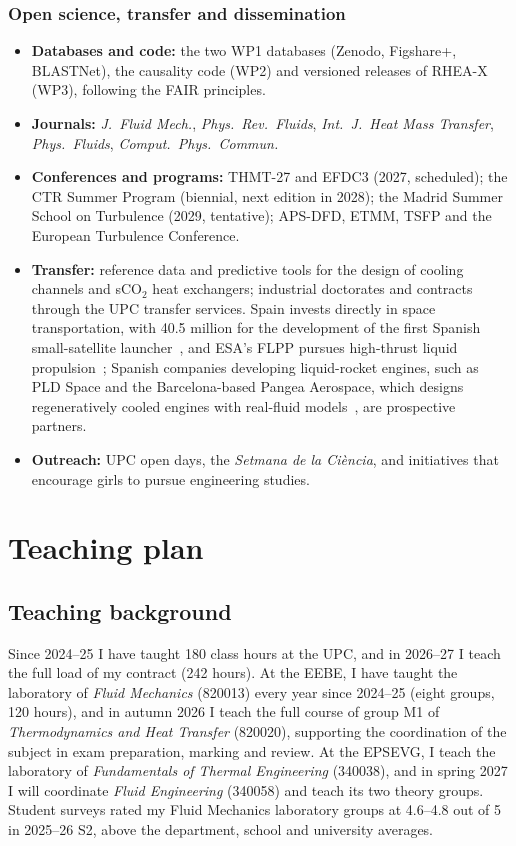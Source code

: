 \documentclass[11pt]{article}
\begin{document}
\subsubsection*{Open science, transfer and dissemination}
\begin{itemize}
  \item \textbf{Databases and code:} the two WP1 databases (Zenodo, Figshare+, BLASTNet), the
  causality code (WP2) and versioned releases of RHEA-X (WP3), following the FAIR principles.
  \item \textbf{Journals:} \emph{J.\ Fluid Mech.}, \emph{Phys.\ Rev.\ Fluids}, \emph{Int.\ J.\
  Heat Mass Transfer}, \emph{Phys.\ Fluids}, \emph{Comput.\ Phys.\ Commun.}
  \item \textbf{Conferences and programs:} THMT-27 and EFDC3 (2027, scheduled); the CTR Summer
  Program (biennial, next edition in 2028); the Madrid Summer School on Turbulence (2029,
  tentative); APS-DFD, ETMM, TSFP and the European Turbulence Conference.
  \item \textbf{Transfer:} reference data and predictive tools for the design of cooling
  channels and sCO$_2$ heat exchangers; industrial doctorates and contracts through the UPC
  transfer services. Spain invests directly in space transportation, with \texteuro{}40.5
  million for the development of the first Spanish small-satellite launcher~\cite{CDTI2024},
  and ESA's FLPP pursues high-thrust liquid propulsion~\cite{ESA2026}; Spanish companies
  developing liquid-rocket engines, such as PLD Space and the Barcelona-based Pangea Aerospace,
  which designs regeneratively cooled engines with real-fluid models~\cite{Esnault2021}, are
  prospective partners.
  \item \textbf{Outreach:} UPC open days, the \emph{Setmana de la Ci\`encia}, and initiatives
  that encourage girls to pursue engineering studies.
\end{itemize}

\section{Teaching plan}\label{sec:teaching}

\subsection{Teaching background}
Since 2024--25 I have taught 180 class hours at the UPC, and in 2026--27 I teach the full
load of my contract (242 hours). At the EEBE, I have taught the laboratory of \emph{Fluid
Mechanics} (820013) every year since 2024--25 (eight groups, 120 hours), and in autumn
2026 I teach the full course of group M1 of \emph{Thermodynamics and Heat Transfer}
(820020), supporting the coordination of the subject in exam preparation, marking and
review. At the EPSEVG, I teach the laboratory of \emph{Fundamentals of Thermal
Engineering} (340038), and in spring 2027 I will coordinate \emph{Fluid Engineering}
(340058) and teach its two theory groups. Student surveys rated my Fluid Mechanics
laboratory groups at 4.6--4.8 out of 5 in 2025--26 S2, above the department, school and
university averages.
\end{document}
